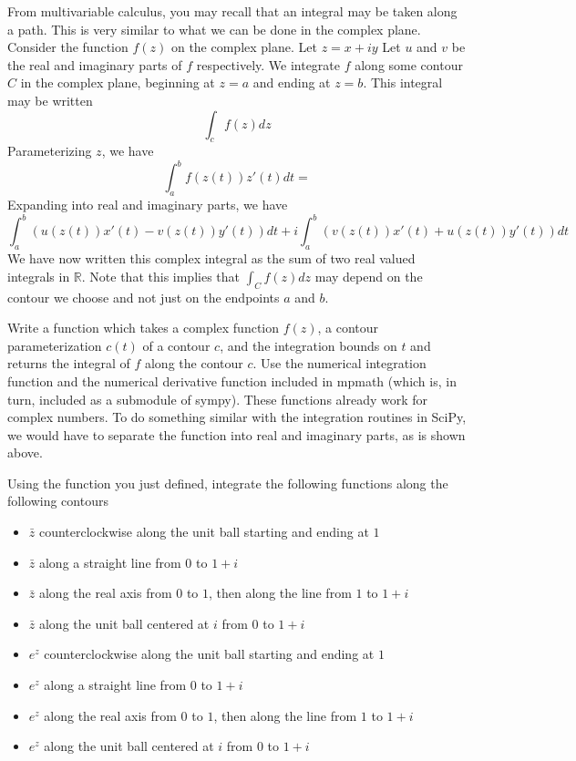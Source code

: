 From multivariable calculus, you may recall that an integral may be taken along a path.
This is very similar to what we can be done in the complex plane.
Consider the function $f(z)$ on the complex plane.
Let $z=x+iy$ Let $u$ and $v$ be the real and imaginary parts of $f$ respectively.
We integrate $f$ along some contour $C$ in the complex plane, beginning at $z=a$ and ending at $z=b$.
This integral may be written
\[\int_c f(z)dz\]
Parameterizing $z$, we have
\[\int_a^b f(z(t))z'(t)dt=\]
Expanding into real and imaginary parts, we have
\[\int_a^b (u(z(t))x'(t)-v(z(t))y'(t))dt +i \int_a^b(v(z(t))x'(t)+u(z(t))y'(t))dt\]
We have now written this complex integral as the sum of two real valued integrals in $\mathbb{R}$.
Note that this implies that $\int_C f(z) dz$ may depend on the contour we choose and not just on the endpoints $a$ and $b$.

\begin{problem}
Write a function which takes a complex function $f(z)$, a contour parameterization $c(t)$ of a contour $c$, and the integration bounds on $t$ and returns the integral of $f$ along the contour $c$.
Use the numerical integration function  and the numerical derivative function  included in mpmath (which is, in turn, included as a submodule of sympy).
These functions already work for complex numbers.
To do something similar with the integration routines in SciPy, we would have to separate the function into real and imaginary parts, as is shown above.

Using the function you just defined, integrate the following functions along the following contours
\begin{itemize}
\item $\bar{z}$ counterclockwise along the unit ball starting and ending at $1$
\item $\bar{z}$ along a straight line from $0$ to $1+i$
\item $\bar{z}$ along the real axis from $0$ to $1$, then along the line from $1$ to $1+i$
\item $\bar{z}$ along the unit ball centered at $i$ from $0$ to $1+i$
\item $e^z$ counterclockwise along the unit ball starting and ending at $1$
\item $e^z$ along a straight line from $0$ to $1+i$
\item $e^z$ along the real axis from $0$ to $1$, then along the line from $1$ to $1+i$
\item $e^z$ along the unit ball centered at $i$ from $0$ to $1+i$
\end{itemize}
\end{problem}

